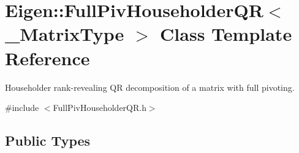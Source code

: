 \hypertarget{class_eigen_1_1_full_piv_householder_q_r}{}\section{Eigen\+::Full\+Piv\+Householder\+QR$<$ \+\_\+\+Matrix\+Type $>$ Class Template Reference}
\label{class_eigen_1_1_full_piv_householder_q_r}


Householder rank-\/revealing QR decomposition of a matrix with full pivoting.  




{\ttfamily \#include $<$Full\+Piv\+Householder\+Q\+R.\+h$>$}

\subsection*{Public Types}
